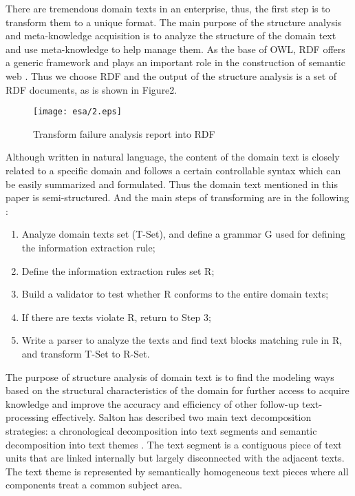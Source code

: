 \documentclass{elsarticle}
\begin{document}
There are tremendous domain texts in an enterprise, thus, the first step
is to transform them to a unique format. The main purpose of the
structure analysis and meta-knowledge acquisition is to analyze the
structure of the domain text and use meta-knowledge to help manage
them. As the base of OWL, RDF offers a generic framework and plays an
important role in the construction of semantic web \cite{lassila1999rdf}. Thus we
choose RDF and the output of the structure analysis is a set of RDF
documents, as is shown in Figure2. 
\begin{figure}[htp]
  \centering
  \texttt{[image: esa/2.eps]}

  \caption{Transform failure analysis report into RDF}
  \label{fig:2}
\end{figure}
Although written in natural language, the content of the domain text
is closely related to a specific domain and follows a certain
controllable syntax which can be easily summarized and
formulated. Thus the domain text mentioned in this paper is
semi-structured. And the main steps of transforming are in the following \cite{Wang2008}:
\begin{enumerate}
\item Analyze domain texts set (T-Set), and define a grammar G used for
defining the information extraction rule;
\item Define the information extraction rules set R;
\item Build a validator to test whether R conforms to the entire domain
texts;
\item If there are texts violate R, return to Step 3;
\item Write a parser to analyze the texts and find text blocks
matching rule in R, and transform T-Set to R-Set.  
\end{enumerate}


The purpose of structure analysis of domain text is to find the
modeling ways based on the structural characteristics of the domain
for further access to acquire knowledge and improve
the accuracy and efficiency of other follow-up
text-processing effectively. Salton has described two main text decomposition
strategies: a chronological decomposition into text segments
and semantic decomposition into text themes \cite{234834}. The text segment is
a contiguous piece of text units that are linked internally but
largely disconnected with the adjacent texts. The text theme is
represented by semantically homogeneous text pieces where all
components treat a common subject area.
\end{document}
